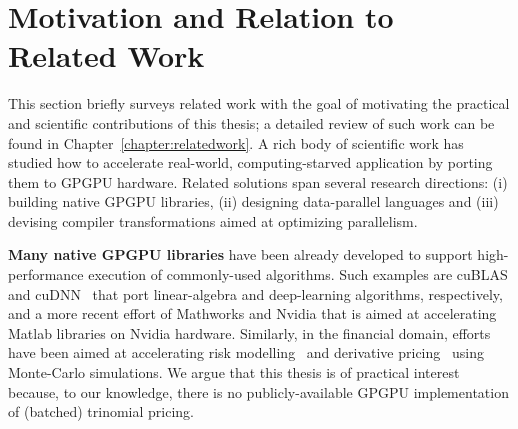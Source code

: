 


\section{Motivation and Relation to Related Work}
\label{section:briefsurveyofrelatedsolutions}

This section briefly surveys related work with the goal of motivating the practical and scientific contributions of this thesis; a detailed review of such work can be found in Chapter~\ref{chapter:relatedwork}.
%
A rich body of scientific work has studied how to accelerate real-world, computing-starved application by porting them to GPGPU hardware. Related solutions span several research directions: (i) building native GPGPU libraries, (ii) designing data-parallel languages and (iii) devising compiler transformations aimed at optimizing parallelism.

{\bf Many native GPGPU libraries} have been already developed to support high-performance execution of commonly-used algorithms. Such examples are cuBLAS and cuDNN~\cite{cudnn} that port linear-algebra and deep-learning algorithms, respectively, and a more recent effort of Mathworks and Nvidia that is aimed at accelerating Matlab libraries on Nvidia hardware. Similarly, in the financial domain, efforts have been aimed at accelerating risk modelling~\cite{FinPar:TACO} and derivative pricing~\cite{LexiFiPricing} using Monte-Carlo simulations. We argue that this thesis is of practical interest because, to our knowledge, there is no publicly-available GPGPU implementation of (batched) trinomial pricing. 

